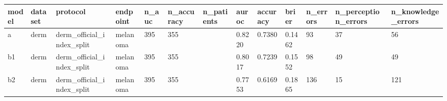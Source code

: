 \begin{tabular}{lllllllllllll}
\hline
model & dataset & protocol & endpoint & n\_auc & n\_accuracy & n\_patients & auroc & accuracy & brier & n\_errors & n\_perception\_errors & n\_knowledge\_errors \\
\hline
a & derm & derm\_official\_index\_split & melanoma & 395 & 355 &  & 0.8220 & 0.7380 & 0.1462 & 93 & 37 & 56 \\
b1 & derm & derm\_official\_index\_split & melanoma & 395 & 355 &  & 0.8017 & 0.7239 & 0.1552 & 98 & 49 & 49 \\
b2 & derm & derm\_official\_index\_split & melanoma & 395 & 355 &  & 0.7753 & 0.6169 & 0.1865 & 136 & 15 & 121 \\
\hline
\end{tabular}
